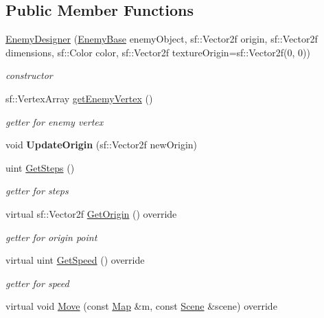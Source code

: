 \subsection*{Public Member Functions}
\begin{DoxyCompactItemize}
\item 
\mbox{\hyperlink{class_enemy_designer_a976f7ec242432ef9d2eb7c181590833b}{Enemy\+Designer}} (\mbox{\hyperlink{class_enemy_base}{Enemy\+Base}} enemy\+Object, sf\+::\+Vector2f origin, sf\+::\+Vector2f dimensions, sf\+::\+Color color, sf\+::\+Vector2f texture\+Origin=sf\+::\+Vector2f(0, 0))
\begin{DoxyCompactList}\small\item\em constructor \end{DoxyCompactList}\item 
sf\+::\+Vertex\+Array \mbox{\hyperlink{class_enemy_designer_a699a16e808c173c28dc7be7c05386ea1}{get\+Enemy\+Vertex}} ()
\begin{DoxyCompactList}\small\item\em getter for enemy vertex \end{DoxyCompactList}\item 
\mbox{\label{class_enemy_designer_a49fd1cb02ff43f7c3264f46ca9f94cb0}} 
void {\bfseries Update\+Origin} (sf\+::\+Vector2f new\+Origin)
\item 
uint \mbox{\hyperlink{class_enemy_designer_a4a1fc18b37685368194461f744937d22}{Get\+Steps}} ()
\begin{DoxyCompactList}\small\item\em getter for steps \end{DoxyCompactList}\item 
virtual sf\+::\+Vector2f \mbox{\hyperlink{class_enemy_designer_a868f397544fe2415d1d6881e7b3acf92}{Get\+Origin}} () override
\begin{DoxyCompactList}\small\item\em getter for origin point \end{DoxyCompactList}\item 
virtual uint \mbox{\hyperlink{class_enemy_designer_a857e6d38180ed66dacb0ba8bfcd02173}{Get\+Speed}} () override
\begin{DoxyCompactList}\small\item\em getter for speed \end{DoxyCompactList}\item 
virtual void \mbox{\hyperlink{class_enemy_designer_a0aa9fb702dc95ad548108379ba3540a8}{Move}} (const \mbox{\hyperlink{class_map}{Map}} \&m, const \mbox{\hyperlink{class_scene}{Scene}} \&scene) override

\end{DoxyCompactItemize}
